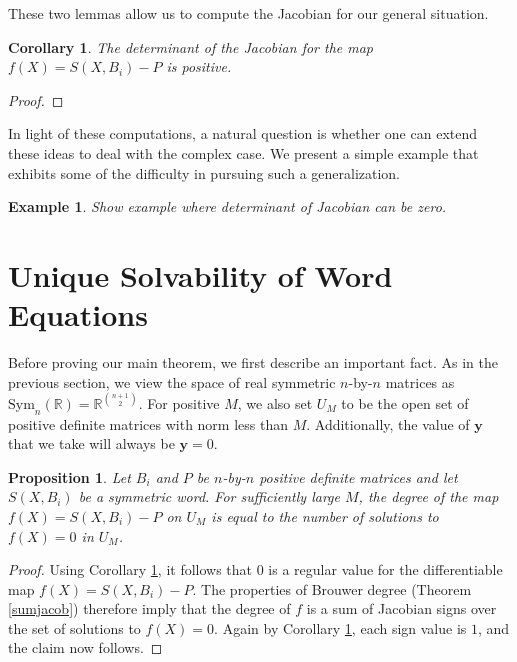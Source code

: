 \documentclass{amsart}
\newtheorem{cor}[thm]{Corollary}
\newtheorem{ex}[thm]{Example}
\newtheorem{prop}[thm]{Proposition}
\theoremstyle{definition}
\theoremstyle{remark}
\numberwithin{equation}{section}
\newcommand{\<}{\langle}
\renewcommand{\>}{\rangle}
\begin{document}
These two lemmas allow us to compute the Jacobian for our general situation.

\begin{cor}\label{signjacobian}
The determinant of the Jacobian for the map $f(X) =
S(X,B_i) - P$ is positive.
\end{cor}
\begin{proof}

\end{proof}

In light of these computations, a natural question is whether one can extend these ideas to deal with the complex case.  We present a simple example that exhibits some of the difficulty in pursuing such a generalization.

\begin{ex}
Show example where determinant of Jacobian can be zero.
\end{ex}




\section{Unique Solvability of Word Equations}

Before proving our main theorem, we first describe an important fact.  As in the previous section, we view the space of real symmetric $n$-by-$n$ matrices as $\text{Sym}_n(\mathbb R)  = \mathbb R^{n+1 \choose 2}$.  For positive $M$, we also set $U_M$ to be the open set of positive definite matrices with norm less than $M$.  Additionally, the value of $\mathbf y$ that we take will always be $\mathbf y = 0$.

\begin{prop}\label{degcountprop}
Let $B_i$ and $P$ be $n$-by-$n$ positive definite matrices and let $S(X,B_i)$ be a symmetric word.  For sufficiently large $M$, the degree of the map $f(X) = S(X,B_i) - P$ on $U_M$ is equal to the number of solutions to $f(X) = 0$ in $U_M$.
\end{prop}

\begin{proof}
Using Corollary \ref{signjacobian}, it follows that $0$ is a regular value for the differentiable map $f(X) = S(X,B_i) -P$.  The properties of Brouwer degree (Theorem \ref{sumjacob}) therefore imply that the degree of $f$ is a sum of Jacobian signs over the set of solutions to $f(X) = 0$.  Again by Corollary \ref{signjacobian}, each sign value is $1$, and the claim now follows.
\end{proof}
\end{document}

